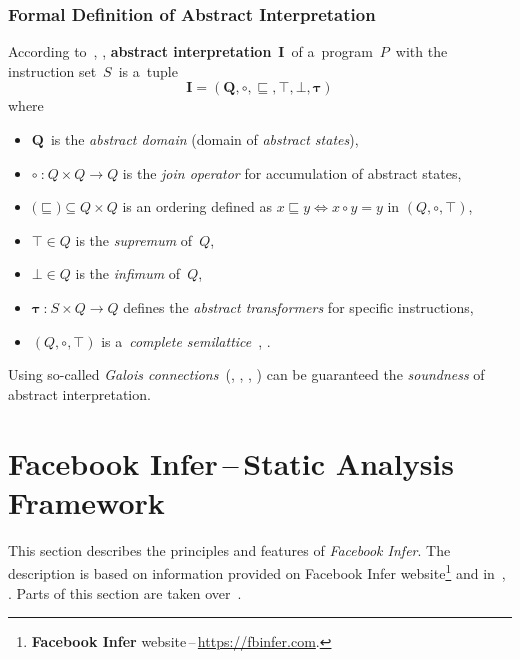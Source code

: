\subsubsection*{Formal Definition of Abstract Interpretation}

According to~\cite{AILatticeModelCousot}, \cite{favAI},
\textbf{abstract interpretation}~$ \boldsymbol{I} $~of a~program~$ P $~with
the instruction set~$ S $~is a~tuple
$$ \boldsymbol{I = (Q, \circ, \sqsubseteq, \top, \bot, \tau)} $$
where
\begin{itemize}
    \item
        $ \boldsymbol{Q} $~is the \emph{abstract domain} (domain of
        \emph{abstract states}),

    \item
        $ \boldsymbol{\circ}~\text{:}~Q \times Q \rightarrow Q $ is the \emph{join
        operator} for accumulation of abstract states,

    \item
        $ \text{(}\boldsymbol{\sqsubseteq}\text{)} \subseteq Q \times Q $ is an
        ordering defined as $ x \sqsubseteq y \Leftrightarrow x \circ y = y $ in
        $ (Q, \circ, \top) $,

    \item
        $ \boldsymbol{\top} \in Q $ is the \emph{supremum} of~$ Q $,

    \item
        $ \boldsymbol{\bot} \in Q $ is the \emph{infimum} of~$ Q $,

    \item
        $ \boldsymbol{\tau}~\text{:}~S \times Q \rightarrow Q $
        defines the \emph{abstract transformers} for specific instructions,

    \item
        $ (Q, \circ, \top) $ is a~\emph{complete
        semilattice}~\cite{favLatticesAndFixpoints}, \cite{favAI}.
\end{itemize}
Using so-called \emph{Galois connections}~(\cite{programAnalysisNielson},
\cite{wideningNarrowingCousot}, \cite{favAI}, \cite{AICousotWeb}) can be
guaranteed the \emph{soundness} of abstract interpretation.


\section{\texorpdfstring{Facebook Infer\,--\,Static Analysis Framework}{}}
\label{sec:fbinfer}

This section describes the principles and features of
\emph{Facebook Infer}. The description is based on information provided
on Facebook Infer website\footnote{\textbf{Facebook Infer}
website\,--\,\url{https://fbinfer.com}.} and in~\cite{inferAISlides},
\cite{projectPracticeMarcin2018}. Parts of this section are taken
over~\cite{excel2019FBInfer}.

